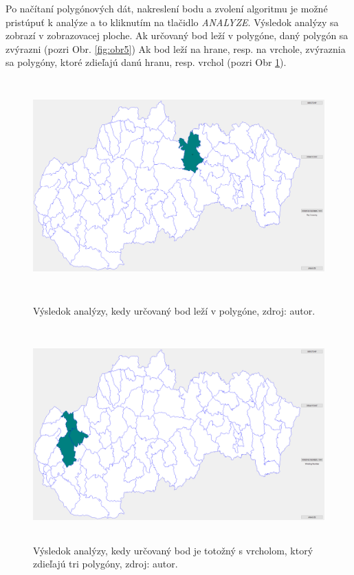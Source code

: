 \documentclass[11pt]{article}
\begin{document}
Po načítaní polygónových dát, nakreslení bodu a zvolení algoritmu je možné pristúpuť k analýze a  to kliknutím na tlačidlo \textit{ANALYZE}.
Výsledok analýzy sa zobrazí v zobrazovacej ploche. Ak určovaný bod leží v polygóne, daný polygón sa zvýrazni (pozri Obr. \ref{fig:obr5}) Ak bod leží na hrane, resp. na vrchole, zvýraznia sa polygóny, ktoré zdieľajú danú hranu, resp. vrchol (pozri Obr \ref{fig:obr6}).
\begin{figure}[htbp]
\captionsetup{justification=centering}
\centering
\includegraphics[width=15.65cm, height=8.2cm]{obr6.png}
\caption{Výsledok analýzy, kedy určovaný bod leží v polygóne, zdroj: autor.}
\label{fig:obr5}

\bigskip

\includegraphics[width=15.65cm, height=8.2cm]{obr7.png}
\caption{Výsledok analýzy, kedy určovaný bod je totožný s vrcholom, ktorý zdieľajú tri polygóny, zdroj: autor.}
\label{fig:obr6}
\end{figure}

\end{document}
